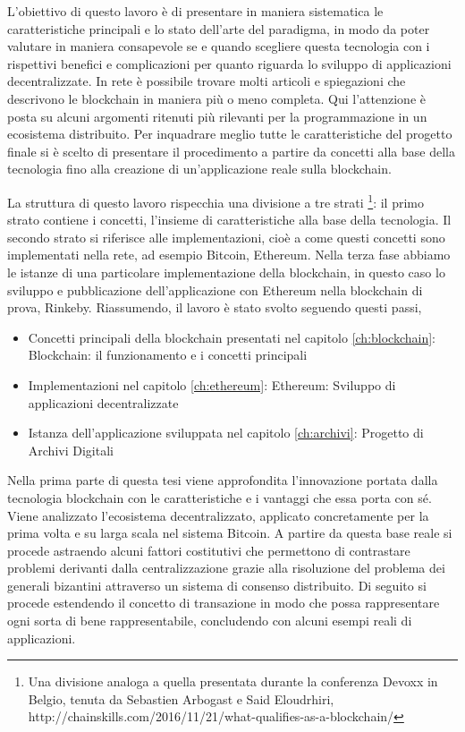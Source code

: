 L’obiettivo di questo lavoro è di presentare in maniera sistematica le caratteristiche principali e lo stato dell’arte del paradigma, in modo da poter valutare in maniera consapevole se e quando scegliere questa tecnologia con i rispettivi benefici e complicazioni per quanto riguarda lo sviluppo di applicazioni decentralizzate. In rete è possibile trovare molti articoli e spiegazioni che descrivono le blockchain in maniera più o meno completa. Qui l’attenzione è posta su alcuni argomenti ritenuti più rilevanti per la programmazione in un ecosistema distribuito. Per inquadrare meglio tutte le caratteristiche del progetto finale si è scelto di presentare il procedimento a partire da concetti alla base della tecnologia fino alla creazione di un'applicazione reale sulla blockchain. 

La struttura di questo lavoro rispecchia una divisione a tre strati \footnote{Una divisione analoga a quella presentata durante la conferenza Devoxx in Belgio, tenuta da Sebastien Arbogast e Said Eloudrhiri, http://chainskills.com/2016/11/21/what-qualifies-as-a-blockchain/}: il primo strato contiene i concetti, l’insieme di caratteristiche alla base della tecnologia. Il secondo strato si riferisce alle implementazioni, cioè a come questi concetti sono implementati nella rete, ad esempio Bitcoin, Ethereum. Nella terza fase abbiamo le istanze di una particolare implementazione della blockchain, in questo caso lo sviluppo e pubblicazione dell’applicazione con Ethereum nella blockchain di prova, Rinkeby. Riassumendo, il lavoro è stato svolto seguendo questi passi,

\begin{itemize}
\item Concetti principali della blockchain presentati nel capitolo \ref{ch:blockchain}: Blockchain: il funzionamento e i concetti principali
\item Implementazioni nel capitolo \ref{ch:ethereum}: Ethereum: Sviluppo di applicazioni decentralizzate
\item Istanza dell’applicazione sviluppata nel capitolo \ref{ch:archivi}: Progetto di Archivi Digitali
\end{itemize}

Nella prima parte di questa tesi viene approfondita l’innovazione portata dalla tecnologia blockchain con le caratteristiche e i vantaggi che essa porta con sé. Viene analizzato l’ecosistema decentralizzato, applicato concretamente per la prima volta e su larga scala nel sistema Bitcoin. A partire da questa base reale si procede astraendo alcuni fattori costitutivi che permettono di contrastare problemi derivanti dalla centralizzazione grazie alla risoluzione del problema dei generali bizantini attraverso un sistema di consenso distribuito.
Di seguito si procede estendendo il concetto di transazione in modo che possa rappresentare ogni sorta di bene rappresentabile, concludendo con alcuni esempi reali di applicazioni.

